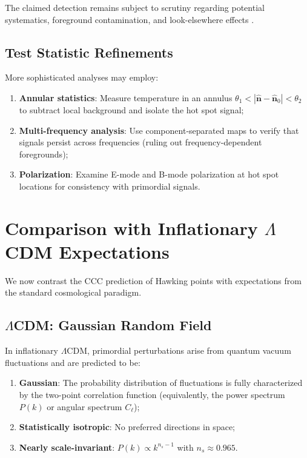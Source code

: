 \documentclass[11pt,a4paper]{article}
\theoremstyle{plain}
\theoremstyle{definition}
\theoremstyle{remark}
\begin{document}
The claimed detection remains subject to scrutiny regarding potential systematics, foreground contamination, and look-elsewhere effects \cite{hawking_points_2020}.

\subsection{Test Statistic Refinements}

More sophisticated analyses may employ:

\begin{enumerate}
    \item \textbf{Annular statistics}: Measure temperature in an annulus $\theta_1 < |\hat{\bm{n}} - \hat{\bm{n}}_0| < \theta_2$ to subtract local background and isolate the hot spot signal;
    \item \textbf{Multi-frequency analysis}: Use component-separated maps to verify that signals persist across frequencies (ruling out frequency-dependent foregrounds);
    \item \textbf{Polarization}: Examine E-mode and B-mode polarization at hot spot locations for consistency with primordial signals.
\end{enumerate}

\section{Comparison with Inflationary \texorpdfstring{$\Lambda$CDM}{LCDM} Expectations}\label{sec:comparison}

We now contrast the CCC prediction of Hawking points with expectations from the standard cosmological paradigm.

\subsection{\texorpdfstring{$\Lambda$CDM}{LCDM}: Gaussian Random Field}

In inflationary $\Lambda$CDM, primordial perturbations arise from quantum vacuum fluctuations and are predicted to be:

\begin{enumerate}
    \item \textbf{Gaussian}: The probability distribution of fluctuations is fully characterized by the two-point correlation function (equivalently, the power spectrum $P(k)$ or angular spectrum $C_\ell$);
    \item \textbf{Statistically isotropic}: No preferred directions in space;
    \item \textbf{Nearly scale-invariant}: $P(k) \propto k^{n_s - 1}$ with $n_s \approx 0.965$.
\end{enumerate}
\end{document}
